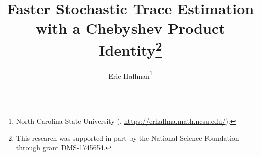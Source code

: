 

\usepackage{lipsum}
\usepackage{amsfonts}
\usepackage{graphicx}
\usepackage{epstopdf}
\usepackage{algorithmic}
\usepackage{subcaption}


\usepackage{lmodern}
\usepackage[T1]{fontenc}

\ifpdf
\else
\fi

\newcommand{\creflastconjunction}{, and~}



\title{Faster Stochastic Trace Estimation with a Chebyshev Product Identity\thanks{
This research was supported in part by the National Science Foundation through grant DMS-1745654.}}

\author{Eric Hallman\thanks{North Carolina State University
  (, \url{https://erhallma.math.ncsu.edu/}).} }

\usepackage{amsopn}
\DeclareMathOperator{\diag}{diag}



\renewcommand{\algorithmicrequire}{\textbf{Input:}}
\renewcommand{\algorithmicensure}{\textbf{Output:}}

\newcommand{\R}{\mathbb{R}}

\newcommand{\ts}{^T}


\DeclareMathOperator*{\Span}{Span}
\DeclareMathOperator*{\trace}{tr}

